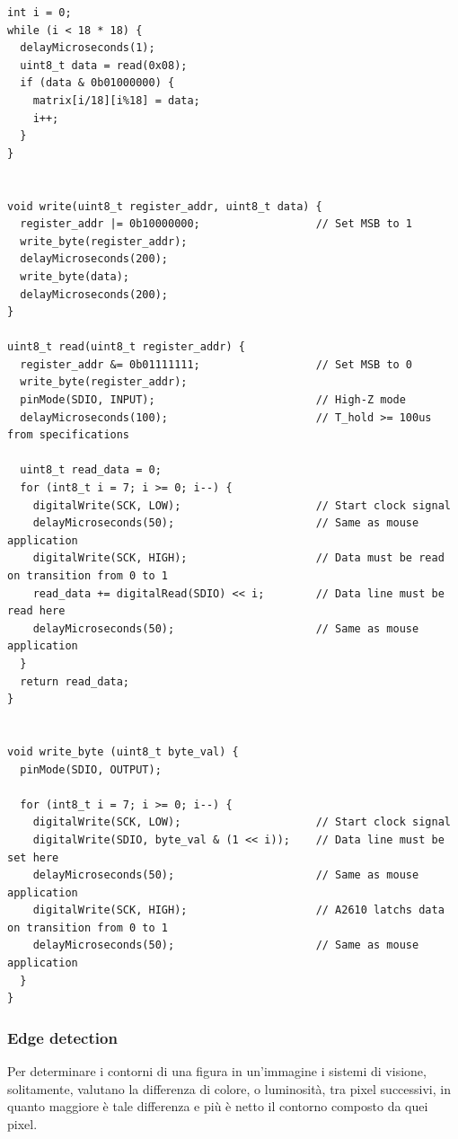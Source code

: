 \documentclass[12pt]{article}
\newenvironment{changemargin}[2]{%
    \begin{list}{}{%
    \setlength{\topsep}{0pt}%
    \setlength{\leftmargin}{#1}%
    \setlength{\rightmargin}{#2}%
    \setlength{\listparindent}{\parindent}%
    \setlength{\itemindent}{\parindent}%
    \setlength{\parsep}{\parskip}%
    }%
    \item[]}{\end{list}}
\begin{document}
        \begin{changemargin}{-2cm}{-2cm}
        \begin{lstlisting}[label={list:protocol_implementation}, style=Arduino, caption=Lettura immagine da sensore, basicstyle=\scriptsize]
int i = 0;
while (i < 18 * 18) {
  delayMicroseconds(1);
  uint8_t data = read(0x08);
  if (data & 0b01000000) {
    matrix[i/18][i%18] = data;
    i++;
  }
}


void write(uint8_t register_addr, uint8_t data) {
  register_addr |= 0b10000000;                  // Set MSB to 1
  write_byte(register_addr);
  delayMicroseconds(200);
  write_byte(data);
  delayMicroseconds(200);
}

uint8_t read(uint8_t register_addr) {
  register_addr &= 0b01111111;                  // Set MSB to 0
  write_byte(register_addr);
  pinMode(SDIO, INPUT);                         // High-Z mode
  delayMicroseconds(100);                       // T_hold >= 100us from specifications

  uint8_t read_data = 0;
  for (int8_t i = 7; i >= 0; i--) {
    digitalWrite(SCK, LOW);                     // Start clock signal
    delayMicroseconds(50);                      // Same as mouse application
    digitalWrite(SCK, HIGH);                    // Data must be read on transition from 0 to 1
    read_data += digitalRead(SDIO) << i;        // Data line must be read here
    delayMicroseconds(50);                      // Same as mouse application
  }
  return read_data;
}


void write_byte (uint8_t byte_val) {
  pinMode(SDIO, OUTPUT);

  for (int8_t i = 7; i >= 0; i--) {
    digitalWrite(SCK, LOW);                     // Start clock signal
    digitalWrite(SDIO, byte_val & (1 << i));    // Data line must be set here
    delayMicroseconds(50);                      // Same as mouse application
    digitalWrite(SCK, HIGH);                    // A2610 latchs data on transition from 0 to 1
    delayMicroseconds(50);                      // Same as mouse application
  }
}       \end{lstlisting}
        \end{changemargin}
        
        \newpage
        \subsubsection{Edge detection}\label{edge_detection}
        Per determinare i contorni di una figura in un'immagine i sistemi di visione, solitamente, valutano la differenza di colore, o luminosità, tra pixel successivi, in quanto maggiore è tale differenza e più è netto il contorno composto da quei pixel.
        
\end{document}
